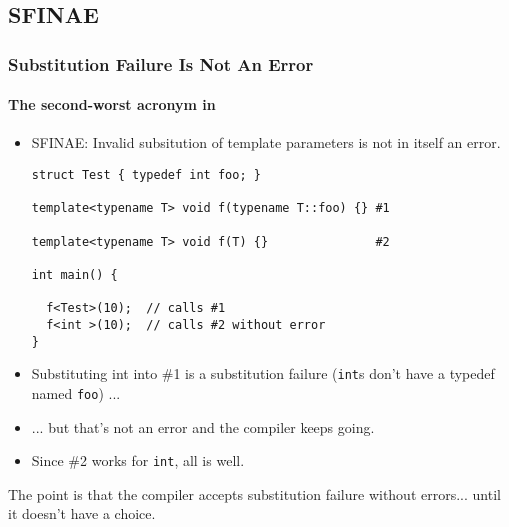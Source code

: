 \subsection{SFINAE}
\begin{frame}[fragile,t]
\frametitle{Substitution Failure Is Not An Error}
\framesubtitle{The second-worst acronym in \CC }
\begin{itemize}[<+->]
\item SFINAE: Invalid subsitution of template parameters is not in itself an error.
{\scriptsize\begin{verbatim}
struct Test { typedef int foo; }

template<typename T> void f(typename T::foo) {} #1

template<typename T> void f(T) {}               #2

int main() {

  f<Test>(10);  // calls #1
  f<int >(10);  // calls #2 without error
}
\end{verbatim}
}
\item Substituting int into \#1 is a substitution failure (\texttt{int}s don't
  have a typedef named \texttt{foo}) ...
\item ... but that's not an error and the compiler keeps going.
\item Since \#2 works for \texttt{int}, all is well.
\end{itemize}
\pause
The point is that the compiler accepts substitution failure without
errors... until it doesn't have a choice.
\end{frame}


